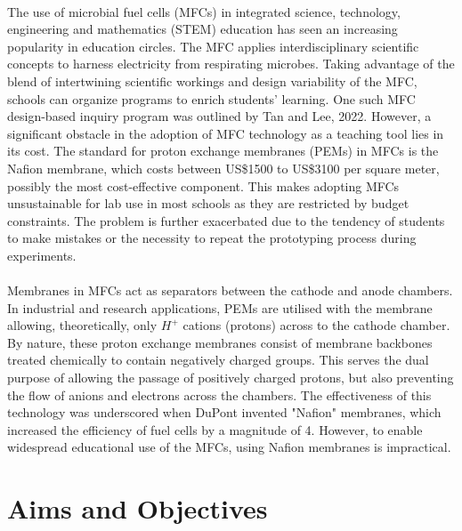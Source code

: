 \documentclass[12pt, twocolumn, a4paper]{article}
\begin{document}
\paragraph{}The use of microbial fuel cells (MFCs) in integrated science, technology, engineering and mathematics (STEM) education has seen an increasing popularity in education circles. The MFC applies interdisciplinary scientific concepts to harness electricity from respirating microbes. Taking advantage of the blend of intertwining scientific workings and design variability of the MFC, schools can organize programs to enrich students' learning. One such MFC design-based inquiry program was outlined by Tan and Lee, 2022. \cite{educsci12060417} However, a significant obstacle in the adoption of MFC technology as a teaching tool lies in its cost. The standard for proton exchange membranes (PEMs) in MFCs is the Nafion\texttrademark{} membrane, which costs between US\$1500 to US\$3100 per square meter, possibly the most cost-effective component. \cite{costnafion} This makes adopting MFCs unsustainable for lab use in most schools as they are restricted by budget constraints. The problem is further exacerbated due to the tendency of students to make mistakes or the necessity to repeat the prototyping process during experiments. \cite{experimentationandeducation} 

\paragraph{}Membranes in MFCs act as separators between the cathode and anode chambers. In industrial and research applications, PEMs are utilised with the membrane allowing, theoretically, only $H^{+}$ cations (protons) across to the cathode chamber. \cite{Kusoglu2017} By nature, these proton exchange membranes consist of membrane backbones treated chemically to contain negatively charged groups. \cite{cole1972membranes} This serves the dual purpose of allowing the passage of positively charged protons, but also preventing the flow of anions and electrons across the chambers. \cite{Hickner2004} The effectiveness of this technology was underscored when DuPont invented "Nafion" membranes, which increased the efficiency of fuel cells by a magnitude of 4. However, to enable widespread educational use of the MFCs, using Nafion membranes is impractical. 

\section{Aims and Objectives}
\end{document}
